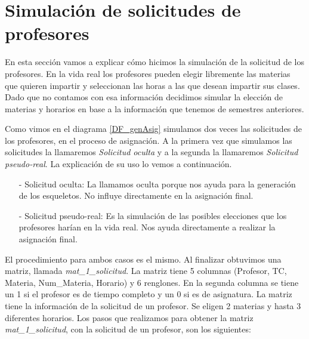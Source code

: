 \section{Simulación de solicitudes de profesores} \label{SimSolicitudesProfesores}

En esta sección vamos a explicar cómo hicimos la simulación de la solicitud de los profesores. En la vida real los profesores pueden elegir libremente las materias que quieren impartir y seleccionan las horas a las que desean impartir sus clases. Dado que no contamos con esa información decidimos simular la elección de materias y horarios en base a la información que tenemos de semestres anteriores.

Como vimos en el diagrama \ref{DF_genAsig} simulamos dos veces las solicitudes de los profesores, en el proceso de asignación. A la primera vez que simulamos las solicitudes la llamaremos \textit{Solicitud oculta} y a la segunda la llamaremos \textit{Solicitud pseudo-real}. La explicación de su uso lo vemos a continuación.

\begin{itemize}
\item[-] Solicitud oculta: La llamamos oculta porque nos ayuda para la generación de los esqueletos. No influye directamente en la asignación final.

\item[-] Solicitud pseudo-real: Es la simulación de las posibles elecciones que los profesores harían en la vida real. Nos ayuda directamente a realizar la asignación final.
\end{itemize}

El procedimiento para ambos casos es el mismo. Al finalizar obtuvimos una matriz, llamada \textit{mat\_1\_solicitud}. La matriz tiene 5 columnas (Profesor, TC, Materia, Num\_Materia, Horario) y 6 renglones. En la segunda columna se tiene un 1 si el profesor es de tiempo completo y un 0 si es de asignatura. La matriz tiene la información de la solicitud de un profesor. Se eligen 2 materias y hasta 3 diferentes horarios.  Los pasos que realizamos para obtener la matriz \textit{mat\_1\_solicitud}, con la solicitud de un profesor, son los siguientes:

